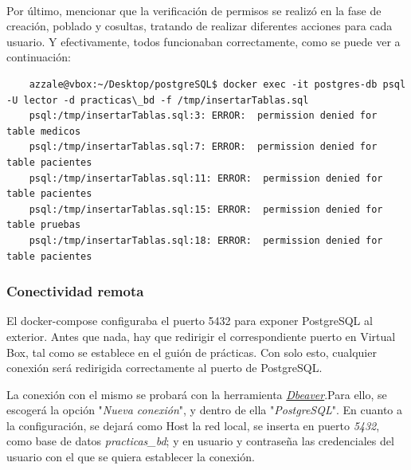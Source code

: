 \documentclass{article}
\begin{document}
\\
Por último, mencionar que la verificación de permisos se realizó en la fase de creación, poblado y cosultas, tratando de realizar diferentes acciones para cada usuario. Y efectivamente, todos funcionaban correctamente, como se puede ver a continuación:
\begin{tcolorbox}[colback=black, coltext=white, fontupper=\ttfamily, title=Terminal]
\begin{verbatim}
    azzale@vbox:~/Desktop/postgreSQL$ docker exec -it postgres-db psql -U lector -d practicas\_bd -f /tmp/insertarTablas.sql
    psql:/tmp/insertarTablas.sql:3: ERROR:  permission denied for table medicos
    psql:/tmp/insertarTablas.sql:7: ERROR:  permission denied for table pacientes
    psql:/tmp/insertarTablas.sql:11: ERROR:  permission denied for table pacientes
    psql:/tmp/insertarTablas.sql:15: ERROR:  permission denied for table pruebas
    psql:/tmp/insertarTablas.sql:18: ERROR:  permission denied for table pacientes
\end{verbatim}
\end{tcolorbox}



\subsubsection{Conectividad remota}

El docker-compose configuraba el puerto 5432 para exponer PostgreSQL al exterior.  Antes que nada, hay que redirigir el correspondiente puerto en Virtual Box, tal como se establece en el guión de prácticas. Con solo esto, cualquier conexión será redirigida correctamente al puerto de PostgreSQL.

La conexión con el mismo se probará con la herramienta \textit{\textcolor{blue}{\href{https://dbeaver.com/download/enterprise/}{Dbeaver}}}.Para ello, se escogerá la opción "\textit{Nueva conexión}", y dentro de ella "\textit{PostgreSQL}". En cuanto a la configuración, se dejará como Host la red local, se inserta en puerto \textit{5432}, como base de datos \textit{practicas\_bd}; y en usuario y contraseña las credenciales del usuario con el que se quiera establecer la conexión. 
\end{document}
